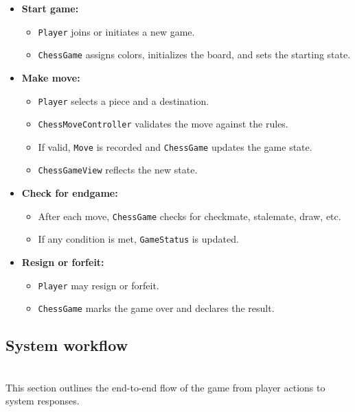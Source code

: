 \begin{itemize}
\item
\protect{}\label{LdDjpVTsxlERqjm-GSEfJ}
\textbf{Start game:}

\begin{itemize}
\item
\texttt{Player} joins or initiates a new game.
\item
\texttt{ChessGame} assigns colors, initializes the board, and sets the starting state.
\end{itemize}
\item
\protect{}\label{SUh8zd20n9Bnk1aeoB0oo}
\textbf{Make move:}

\begin{itemize}
\item
\texttt{Player} selects a piece and a destination.
\item
\texttt{ChessMoveController} validates the move against the rules.
\item
If valid, \texttt{Move} is recorded and \texttt{ChessGame} updates the game state.
\item
\texttt{ChessGameView} reflects the new state.
\end{itemize}
\item
\protect{}\label{nTmek3aI_3-HrM4yCqK4Z}
\textbf{Check for endgame:}

\begin{itemize}
\item
After each move, \texttt{ChessGame} checks for checkmate, stalemate, draw, etc.
\item
If any condition is met, \texttt{GameStatus} is updated.
\end{itemize}
\item
\protect{}\label{WrjezFNJy2ocQ_mqw6dGP}
\textbf{Resign or forfeit:}

\begin{itemize}
\item
\texttt{Player} may resign or forfeit.
\item
\texttt{ChessGame} marks the game over and declares the result.
\end{itemize}
\end{itemize}

\subsection{System workflow}\label{hKYDVlx11trVimx4kca05}
\\
This section outlines the end-to-end flow of the game from player actions to system responses.

